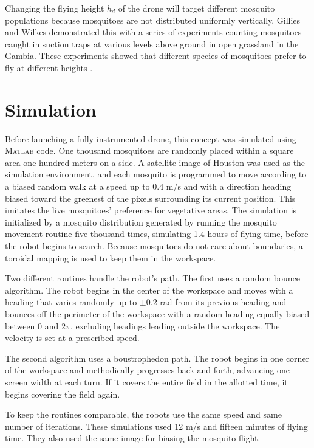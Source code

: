 \documentclass[letterpaper, 10 pt, conference]{ieeeconf}  %
\begin{document}
Changing the flying height $h_d$ of the drone will target different mosquito populations   because mosquitoes are not distributed uniformly vertically.  Gillies and Wilkes demonstrated this with a series of experiments counting mosquitoes caught in suction traps at various levels above ground in open grassland in the Gambia.  These experiments showed that different species of mosquitoes prefer to fly at different heights \cite{gillies1976vertical}.
  
  
    \section{Simulation}
    
   Before launching a fully-instrumented drone, this concept was simulated using \textsc{Matlab} code.  One thousand mosquitoes are randomly placed within a square area one hundred meters on a side.  A satellite image of Houston was used as the simulation environment, and each mosquito is programmed to move according to a biased random walk at a speed up to 0.4 m/s and with a direction heading biased toward the greenest of the pixels surrounding its current position.  This imitates the live mosquitoes' preference for vegetative areas.  
   The simulation is initialized by a mosquito distribution generated by running the mosquito movement routine  five thousand times, simulating 1.4 hours of flying time, before the robot begins to search.  Because mosquitoes do not care about boundaries, a toroidal mapping is used to keep them in the workspace.
    
Two different routines handle the robot's path.  The first uses a random bounce algorithm.  The robot begins in the center of the workspace and moves with a heading that varies randomly up to $\pm$0.2 rad from its previous heading and bounces off the perimeter of the workspace with a random heading equally biased between 0 and $2\pi$, excluding headings leading outside the workspace.  The velocity is set at a prescribed speed.

The second algorithm uses a boustrophedon path.  The robot begins in one corner of the workspace and methodically progresses back and forth, advancing one screen width at each turn.  If it covers the entire field in the allotted time, it begins covering the field again.

To keep the routines comparable, the robots use the same speed and same number of iterations.  These simulations used 12 m/s and fifteen minutes of flying time.  They also used the same image for biasing the mosquito flight.
\end{document}
